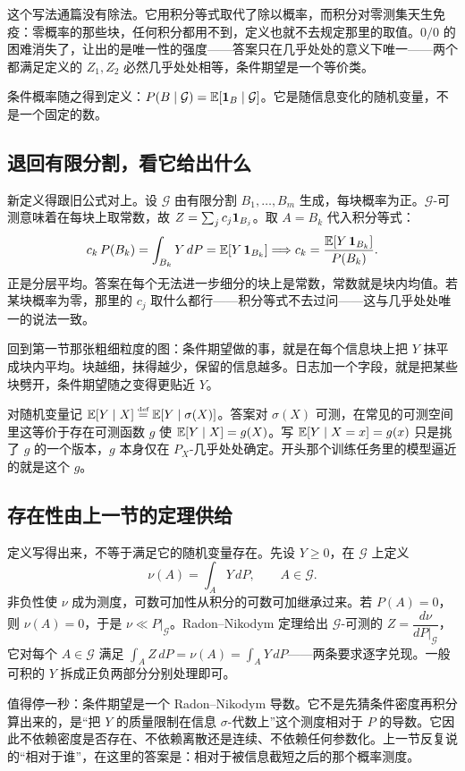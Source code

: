 这个写法通篇没有除法。它用积分等式取代了除以概率，而积分对零测集天生免疫：零概率的那些块，任何积分都用不到，定义也就不去规定那里的取值。\(0/0\) 的困难消失了，让出的是唯一性的强度——答案只在几乎处处的意义下唯一——两个都满足定义的 \(Z_1,Z_2\) 必然几乎处处相等，条件期望是一个等价类。

条件概率随之得到定义：\(P(B\mid\mathcal G)=\mathbb{E}[\mathbf{1}_B\mid\mathcal G]\)。它是随信息变化的随机变量，不是一个固定的数。

\subsection{退回有限分割，看它给出什么}

新定义得跟旧公式对上。设 \(\mathcal G\) 由有限分割 \(B_1,\ldots,B_m\) 生成，每块概率为正。\(\mathcal G\)-可测意味着在每块上取常数，故 \(Z=\sum_j c_j\mathbf{1}_{B_j}\)。取 \(A=B_k\) 代入积分等式：
\[
c_k\,P(B_k)=\int_{B_k}Y\,dP=\mathbb{E}[Y\,\mathbf{1}_{B_k}]
\space\Longrightarrow\space
c_k=\frac{\mathbb{E}[Y\,\mathbf{1}_{B_k}]}{P(B_k)}.
\]
正是分层平均。答案在每个无法进一步细分的块上是常数，常数就是块内均值。若某块概率为零，那里的 \(c_j\) 取什么都行——积分等式不去过问——这与几乎处处唯一的说法一致。

回到第一节那张粗细粒度的图：条件期望做的事，就是在每个信息块上把 \(Y\) 抹平成块内平均。块越细，抹得越少，保留的信息越多。日志加一个字段，就是把某些块劈开，条件期望随之变得更贴近 \(Y\)。

对随机变量记 \(\mathbb{E}[Y\mid X]\stackrel{\text{\tiny def}}{=}\mathbb{E}[Y\mid\sigma(X)]\)。答案对 \(\sigma(X)\) 可测，在常见的可测空间里这等价于存在可测函数 \(g\) 使 \(\mathbb{E}[Y\mid X]=g(X)\)。写 \(\mathbb{E}[Y\mid X=x]=g(x)\) 只是挑了 \(g\) 的一个版本，\(g\) 本身仅在 \(P_X\)-几乎处处确定。开头那个训练任务里的模型逼近的就是这个 \(g\)。

\subsection{存在性由上一节的定理供给}

定义写得出来，不等于满足它的随机变量存在。先设 \(Y\ge 0\)，在 \(\mathcal G\) 上定义
\[
\nu(A)=\int_A Y\,dP,\qquad A\in\mathcal G.
\]
非负性使 \(\nu\) 成为测度，可数可加性从积分的可数可加继承过来。若 \(P(A)=0\)，则 \(\nu(A)=0\)，于是 \(\nu\ll P|_{\mathcal G}\)。Radon--Nikodym 定理给出 \(\mathcal G\)-可测的 \(Z=\dfrac{d\nu}{dP|_{\mathcal G}}\)，它对每个 \(A\in\mathcal G\) 满足 \(\int_A Z\,dP=\nu(A)=\int_A Y\,dP\)——两条要求逐字兑现。一般可积的 \(Y\) 拆成正负两部分分别处理即可。

值得停一秒：条件期望是一个 Radon--Nikodym 导数。它不是先猜条件密度再积分算出来的，是``把 \(Y\) 的质量限制在信息 \(\sigma\)-代数上''这个测度相对于 \(P\) 的导数。它因此不依赖密度是否存在、不依赖离散还是连续、不依赖任何参数化。上一节反复说的``相对于谁''，在这里的答案是：相对于被信息截短之后的那个概率测度。


